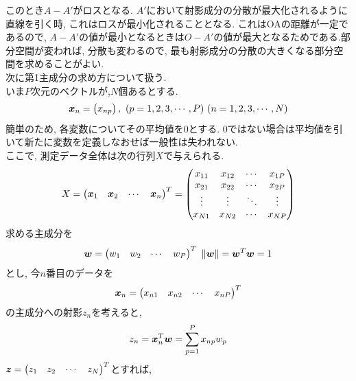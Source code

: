 \documentclass[dvipdfmx,a4j]{jsarticle}
\begin{document}
  このとき$A-A'$がロスとなる. $A'$において射影成分の分散が最大化されるように直線を引く時, これはロスが最小化されることとなる. これはOAの距離が一定であるので, $A-A'$の値が最小となるときは$O-A'$の値が最大となるためである.部分空間が変われば, 分散も変わるので, 最も射影成分の分散の大きくなる部分空間を求めることがよい. \\
  次に第1主成分の求め方について扱う.\\
  いま$P$次元のベクトルが,$N$個あるとする.
  \begin{eqnarray*}
    \mbox{\boldmath $x$}_{n}=\begin{pmatrix}x_{np}\end{pmatrix},\ (p=1,2,3,\cdots,P)\ (n=1,2,3,\cdots,N)
  \end{eqnarray*}
  簡単のため, 各変数についてその平均値を0とする. 0ではない場合は平均値を引いて新たに変数を定義しなおせば一般性は失われない.\\
  ここで, 測定データ全体は次の行列$X$で与えられる.
  \begin{eqnarray*}
    X=\begin{pmatrix} \mbox{\boldmath $x$}_{1}&\mbox{\boldmath $x$}_{2}&\cdots&\mbox{\boldmath $x$}_{n}\end{pmatrix}^{T}=\begin{pmatrix} x_{11}&x_{12}&\cdots&x_{1P}\\ x_{21}&x_{22}&\cdots&x_{2P}\\\vdots&\vdots&\ddots&\vdots \\ x_{N1}&x_{N2}&\cdots&x_{NP} \end{pmatrix}
  \end{eqnarray*}
  求める主成分を
  \begin{eqnarray*}
    \mbox{\boldmath $w$} = \begin{pmatrix}w_{1}&w_{2}&\cdots&w_{P}\end{pmatrix}^{T}\ \|\mbox{\boldmath $w$}\|=\mbox{\boldmath $w$}^{T}\mbox{\boldmath $w$}=1
  \end{eqnarray*}
  とし, 今$n$番目のデータを
  \begin{eqnarray*}
    \mbox{\boldmath $x$}_{n}=\begin{pmatrix} x_{n1}&x_{n2}&\cdots&x_{nP}\end{pmatrix}^{T}
  \end{eqnarray*}
  の主成分への射影$z_{n}$を考えると,
  \begin{eqnarray*}
    z_{n}=\mbox{\boldmath $x$}_{n}^{T}\mbox{\boldmath $w$}=\sum_{p=1}^{P}x_{np}w_{p}
  \end{eqnarray*}
  $\mbox{\boldmath $z$}=\begin{pmatrix}z_{1}&z_{2}&\cdots &z_{N}\end{pmatrix}^{T}$とすれば,
\end{document}
